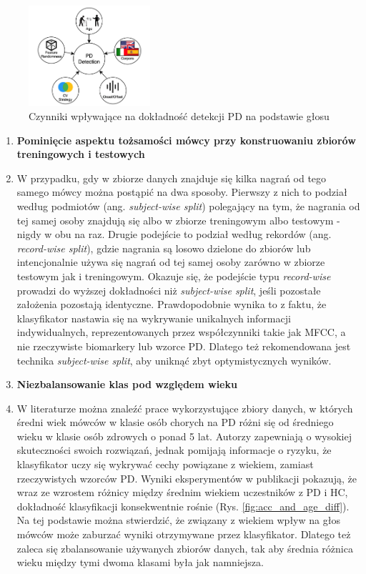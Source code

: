 \begin{figure}[htbp]
	\centering
	\includegraphics[width=0.4\textwidth]{./img/influence_of_factors_on_PD_detection}
	\caption{Czynniki wpływające na dokładność detekcji PD na podstawie głosu \cite{SustainedVowelsProblems}}
    \label{fig:factors_PD_detection}
\end{figure}


\begin{enumerate}[label={\alph*)}]
	\item \textbf{Pominięcie aspektu tożsamości mówcy przy konstruowaniu zbiorów treningowych i testowych}
	\item[] W przypadku, gdy w zbiorze danych znajduje się kilka nagrań od tego samego mówcy można postąpić na dwa sposoby.
Pierwszy z nich to podział według podmiotów (ang. \emph{subject-wise split}) polegający na tym, że nagrania od tej samej
osoby znajdują się albo w zbiorze treningowym albo testowym - nigdy w obu na raz.
Drugie podejście to podział według rekordów (ang. \emph{record-wise split}), gdzie nagrania są losowo dzielone do zbiorów
lub intencjonalnie używa się nagrań od tej samej osoby zarówno w zbiorze testowym jak i treningowym.
Okazuje się, że podejście typu \emph{record-wise} prowadzi do wyższej dokładności niż \emph{subject-wise split}, jeśli pozostałe założenia pozostają identyczne.
Prawdopodobnie wynika to z faktu, że klasyfikator nastawia się na wykrywanie unikalnych informacji indywidualnych,
reprezentowanych przez współczynniki takie jak MFCC, a nie rzeczywiste biomarkery lub wzorce PD.
Dlatego też rekomendowana jest technika \emph{subject-wise split}, aby uniknąć zbyt optymistycznych wyników.

  	\item \textbf{Niezbalansowanie klas pod względem wieku}
	\item[] W literaturze można znaleźć prace wykorzystujące zbiory danych, w których średni wiek mówców
w klasie osób chorych na PD różni się od średniego wieku w klasie osób zdrowych o ponad 5 lat.
Autorzy zapewniają o wysokiej skuteczności swoich rozwiązań, jednak pomijają informacje o ryzyku, że klasyfikator
uczy się wykrywać cechy powiązane z wiekiem, zamiast rzeczywistych wzorców PD.
Wyniki eksperymentów w publikacji \cite{SustainedVowelsProblems} pokazują, że wraz ze wzrostem różnicy między średnim wiekiem uczestników z PD i HC,
dokładność klasyfikacji konsekwentnie rośnie (Rys. \ref{fig:acc_and_age_diff}).
Na tej podstawie można stwierdzić, że związany z wiekiem wpływ na głos mówców może zaburzać wyniki otrzymywane przez klasyfikator.
Dlatego też zaleca się zbalansowanie używanych zbiorów danych, tak aby średnia różnica wieku między tymi dwoma klasami była jak namniejsza.



\end{enumerate}
